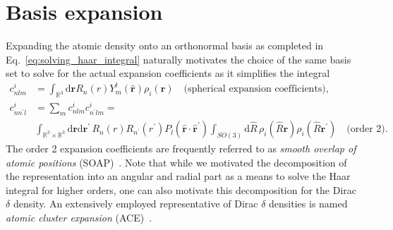 

\section{Basis expansion}
Expanding the atomic density onto an orthonormal basis as completed in Eq.~\eqref{eq:solving_haar_integral} naturally motivates the choice of the same basis set to solve for the actual expansion coefficients as it simplifies the integral
\begin{subequations}
\label{eq:acdc_expansion}
\begin{align}
    \label{eq:gaussian_expansion}
    c^i_{nlm} &= \int_{\mathbb{R}^3}\mathrm{d}\mathbf{r} R_n(r)Y_m^l(\hat{\mathbf{r}})\rho_i(\mathbf{r})\quad\textrm{(spherical expansion coefficients),}\\
    c^i_{nn^\prime l} &= \sum_m c^i_{nlm}c^i_{n^\prime lm} = \nonumber \\
    \label{eq:soap_expansion}
                         &\int_{\mathbb{R}^3\times\mathbb{R}^3}\mathrm{d}\mathbf{r}\mathrm{d}\mathbf{r}^\prime\, R_n(r)R_{n^\prime}(r^\prime)P_l(\hat{\mathbf{r}}\cdot\hat{\mathbf{r}}^\prime) \int_{SO(3)}\mathrm{d}\hat{R}\,\rho_i(\hat{R}\mathbf{r})\rho_i(\hat{R}\mathbf{r}^\prime)\quad\textrm{(order 2)}.
\end{align}
\end{subequations}
The order 2 expansion coefficients are frequently referred to as \emph{smooth overlap of atomic positions} (SOAP)~\cite{bart+13prb}.
Note that while we motivated the decomposition of the representation into an angular and radial part as a means to solve the Haar integral for higher orders, one can also motivate this decomposition for the Dirac $\delta$ density.
An extensively employed representative of Dirac $\delta$ densities is named \emph{atomic cluster expansion} (ACE)~\cite{drautz2019atomic}.


